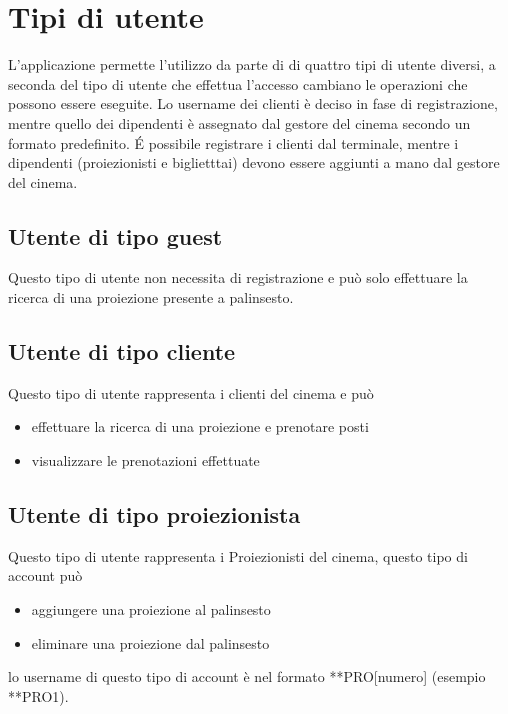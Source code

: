 \documentclass[a4paper, 12pt, titlepage, openany]{book}
\begin{document}
\chapter{Tipi di utente}
L'applicazione permette l'utilizzo da parte di di quattro tipi di utente diversi, a seconda del tipo di utente che effettua l'accesso cambiano le operazioni che possono essere eseguite.
Lo username dei clienti è deciso in fase di registrazione, mentre quello dei dipendenti è assegnato dal gestore del cinema secondo  un formato predefinito. \'E possibile registrare i clienti dal terminale, mentre i dipendenti (proiezionisti e biglietttai) devono essere aggiunti a mano dal gestore del cinema.
\section{Utente di tipo guest}
Questo tipo di utente non necessita di registrazione e può solo effettuare la ricerca di una proiezione presente a palinsesto.
\section{Utente di tipo cliente}
Questo tipo di utente rappresenta i clienti del cinema e può
\begin{center}
\begin{varwidth}{\textwidth}
\begin{itemize}
\item[•] effettuare la ricerca di una proiezione e prenotare posti
\item[•] visualizzare le prenotazioni effettuate
\end{itemize}
\end{varwidth}
\end{center} 
\section{Utente di tipo proiezionista}
Questo tipo di utente rappresenta i Proiezionisti del cinema, questo tipo di account può
\begin{center}
\begin{varwidth}{\textwidth}
\begin{itemize}
\item[•] aggiungere una proiezione al palinsesto
\item[•] eliminare una proiezione dal palinsesto
\end{itemize}
\end{varwidth}
\end{center} 
lo username di questo tipo di account è nel formato **PRO[numero] (esempio **PRO1).
\end{document}
